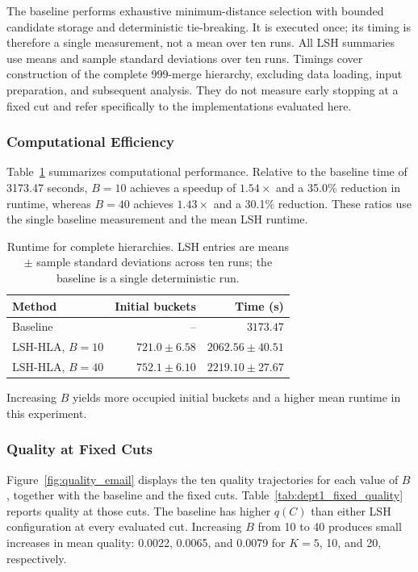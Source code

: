 The baseline performs exhaustive minimum-distance selection with bounded candidate storage and deterministic tie-breaking. It is executed once; its timing is therefore a single measurement, not a mean over ten runs. All LSH summaries use means and sample standard deviations over ten runs. Timings cover construction of the complete 999-merge hierarchy, excluding data loading, input preparation, and subsequent analysis. They do not measure early stopping at a fixed cut and refer specifically to the implementations evaluated here.

\subsubsection*{Computational Efficiency}
Table~\ref{tab:dept1_performance} summarizes computational performance. Relative to the baseline time of 3173.47 seconds, $B=10$ achieves a speedup of $1.54\times$ and a 35.0\% reduction in runtime, whereas $B=40$ achieves $1.43\times$ and a 30.1\% reduction. These ratios use the single baseline measurement and the mean LSH runtime.

\begin{table}[ht]
\centering
\begin{tabular}{lrr}
\hline
Method & Initial buckets & Time (s) \\
\hline
Baseline & -- & $3173.47$ \\
LSH-HLA, $B=10$ & $721.0\pm6.58$ & $2062.56\pm40.51$ \\
LSH-HLA, $B=40$ & $752.1\pm6.10$ & $2219.10\pm27.67$ \\
\hline
\end{tabular}
\caption{Runtime for complete hierarchies. LSH entries are means $\pm$ sample standard deviations across ten runs; the baseline is a single deterministic run.}
\label{tab:dept1_performance}
\end{table}

Increasing $B$ yields more occupied initial buckets and a higher mean runtime in this experiment.

\subsubsection*{Quality at Fixed Cuts}
Figure~\ref{fig:quality_email} displays the ten quality trajectories for each value of $B$, together with the baseline and the fixed cuts. Table~\ref{tab:dept1_fixed_quality} reports quality at those cuts. The baseline has higher $q(C)$ than either LSH configuration at every evaluated cut. Increasing $B$ from 10 to 40 produces small increases in mean quality: 0.0022, 0.0065, and 0.0079 for $K=5$, 10, and 20, respectively.

